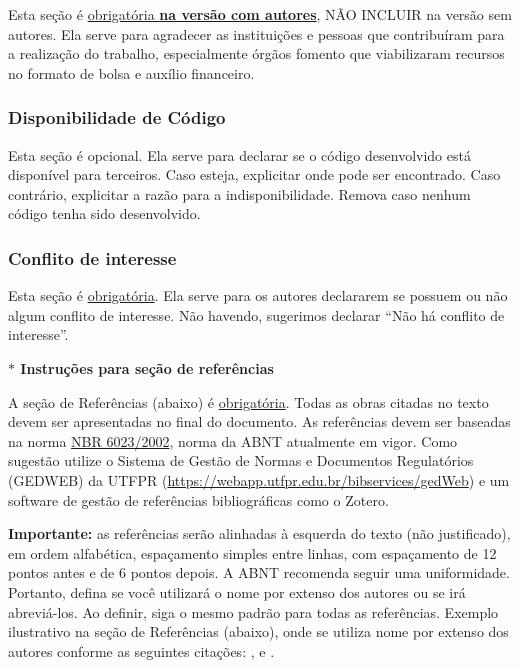 \documentclass[%
  article,%
  a4paper,%
  11pt,%
  fleqn,%
  oneside,%
  chapter = TITLE,%
  section = TITLE,%
]{abntex2}
\begin{document}
Esta seção é \underline{obrigatória \textbf{na versão com autores}}, NÃO INCLUIR na versão sem autores. Ela serve para agradecer as instituições e pessoas que contribuíram para a realização do trabalho, especialmente órgãos fomento que viabilizaram recursos no formato de bolsa e auxílio financeiro. 

\subsubsection{Disponibilidade de Código}

Esta seção é opcional. Ela serve para declarar se o código desenvolvido está disponível para terceiros. Caso esteja, explicitar onde pode ser encontrado. Caso contrário, explicitar a razão para a indisponibilidade. Remova caso nenhum código tenha sido desenvolvido. 

\subsubsection{Conflito de interesse}

Esta seção é \underline{obrigatória}. Ela serve para os autores declararem se possuem ou não algum conflito de interesse. Não havendo, sugerimos declarar “Não há conflito de interesse”.

\begin{center}
    \textbf{$\ast$ Instruções para seção de referências}
\end{center}


A seção de Referências (abaixo) é \underline{obrigatória}. Todas as obras citadas no texto devem ser apresentadas no final do documento. As referências devem ser baseadas na norma \href{http://portal.utfpr.edu.br/alunos/normas-academicas/normas-para-trabalhos-academicos}{NBR 6023/2002}, norma da ABNT atualmente em vigor. Como sugestão utilize o Sistema de Gestão de Normas e Documentos Regulatórios (GEDWEB) da UTFPR (\url{https://webapp.utfpr.edu.br/bibservices/gedWeb}) e um software de gestão de referências bibliográficas como o Zotero.

\textbf{Importante:} as referências serão alinhadas à esquerda do texto (não justificado), em ordem alfabética, espaçamento simples entre linhas, com espaçamento de 12 pontos antes e de 6 pontos depois. A ABNT recomenda seguir uma uniformidade. Portanto, defina se você utilizará o nome por extenso dos autores ou se irá abreviá-los. Ao definir, siga o mesmo padrão para todas as referências. 
Exemplo ilustrativo na seção de Referências (abaixo), onde se utiliza  nome por extenso dos autores conforme as seguintes citações: 
\cite{volpato2016autoria},
\cite{schneider2020efeitos} e
\cite{MEDEIROS_2021}.

\printbibliography[title={\raggedright{Referências}}]

\end{document}
